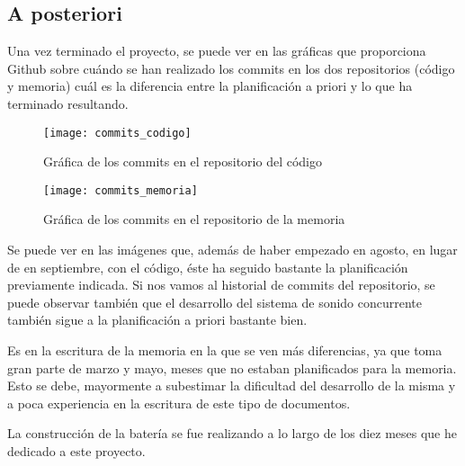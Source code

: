 
        \subsection{A posteriori} %
        \label{sub:APosteriori}

            Una vez terminado el proyecto, se puede ver en las gráficas que proporciona Github sobre cuándo se han
            realizado los commits en los dos repositorios (código y memoria) cuál es la diferencia entre la
            planificación a priori y lo que ha terminado resultando.

            \begin{figure}[ht]
                \centering
                \texttt{[image: commits\_codigo]}
                \caption{Gráfica de los commits en el repositorio del código\label{fig:CommitsCodigo}}
            \end{figure}

            \begin{figure}[ht]
                \centering
                \texttt{[image: commits\_memoria]}
                \caption{Gráfica de los commits en el repositorio de la memoria\label{fig:CommitsMemoria}}
            \end{figure}

            Se puede ver en las imágenes que, además de haber empezado en agosto, en lugar de en septiembre, con el
            código, éste ha seguido bastante la planificación previamente indicada. Si nos vamos al historial de commits
            del repositorio, se puede observar también que el desarrollo del sistema de sonido concurrente también sigue
            a la planificación a priori bastante bien.

            Es en la escritura de la memoria en la que se ven más diferencias, ya que toma gran parte de marzo y mayo,
            meses que no estaban planificados para la memoria. Esto se debe, mayormente a subestimar la dificultad del
            desarrollo de la misma y a poca experiencia en la escritura de este tipo de documentos.

            La construcción de la batería se fue realizando a lo largo de los diez meses que he dedicado a este
            proyecto.



